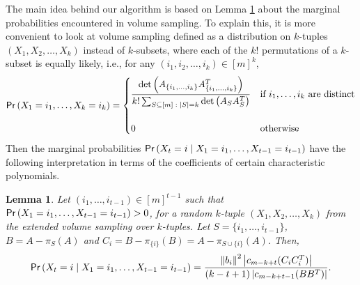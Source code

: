 \documentclass[11pt]{article}
\newtheorem{lemma}[theorem]{Lemma}
\def\suchthat{\;:\;}
\def\given{\;|\;}
\newcommand{\deter}[1]{\operatorname{det}\left(#1\right)}
\newcommand{\norm}[1]{\left\|#1\right\|}
\newcommand{\prob}[1]{{\sf Pr} \left(#1\right)}
\newcommand{\abs}[1]{\left|#1\right|}
\newcommand{\size}[1]{\left|#1\right|}
\begin{document}
The main idea behind our algorithm is based on Lemma \ref{lemma:marginals} about the marginal probabilities encountered in volume sampling. To explain this, it is more convenient to look at volume sampling defined as a distribution on $k$-tuples $(X_{1}, X_{2}, \dotsc, X_{k})$ instead of $k$-subsets, where each of the $k!$ permutations of a $k$-subset is equally likely, i.e., for any $(i_{1}, i_{2}, \dotsc, i_{k}) \in [m]^{k}$,
\[
\prob{X_{1} = i_{1}, \dotsc, X_{k} = i_{k}} = \begin{cases} \dfrac{\deter{A_{\{i_{1}, \dotsc, i_{k}\}} A_{\{i_{1}, \dotsc, i_{k}\}}^{T}}}{k! \sum_{S \subseteq [m] \suchthat \size{S}=k} \deter{A_{S} A_{S}^{T}}} & \text{if $i_{1}, \dotsc, i_{k}$ are distinct} \\ \quad & \quad \\ 0 & \text{otherwise} \end{cases}
\]
Then the marginal probabilities $\prob{X_{t} = i \given X_{1} = i_{1}, \dotsc, X_{t-1} = i_{t-1}}$ have the following interpretation in terms of the coefficients of certain characteristic polynomials.
\begin{lemma} \label{lemma:marginals}
Let $(i_{1}, \dotsc, i_{t-1}) \in [m]^{t-1}$ such that $\prob{X_{1} = i_{1}, \dotsc, X_{t-1} = i_{t-1}} > 0$, for a random $k$-tuple $(X_{1}, X_{2}, \dotsc, X_{k})$ from the extended volume sampling over $k$-tuples. Let $S = \{i_{1}, \dotsc, i_{t-1}\}$, $B = A - \pi_{S}(A)$ and $C_{i} = B - \pi_{\{i\}}(B) = A - \pi_{S \cup \{i\}}(A)$. Then, \[
\prob{X_{t} = i \given X_{1} = i_{1}, \dotsc, X_{t-1} = i_{t-1}} = \frac{\norm{b_{i}}^{2} \abs{c_{m-k+t}(C_{i} C_{i}^{T})}}{(k-t+1) \abs{c_{m-k+t-1}(BB^{T})}}.
\]
\end{lemma}
\end{document}
